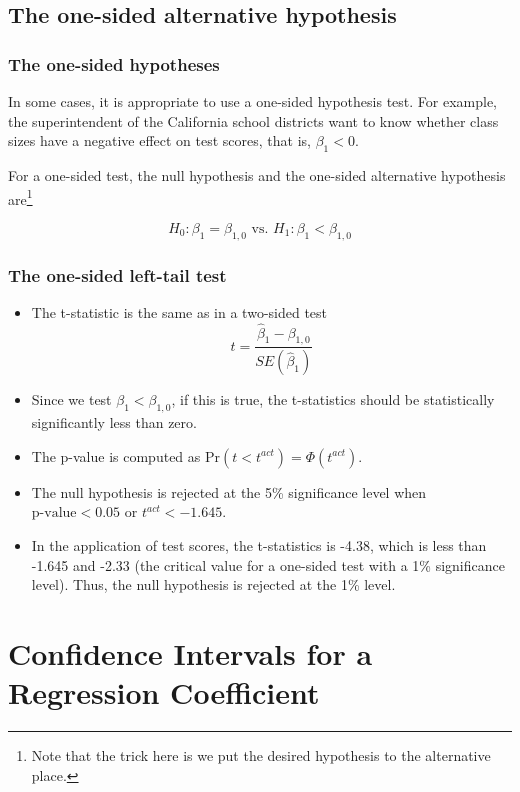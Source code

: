 \documentclass[a4paper,11pt]{article}
\newcommand{\pr}{\mathrm{Pr}}
\begin{document}
\subsection{The one-sided alternative hypothesis}
\label{sec:org183e3d3}
\subsubsection*{The one-sided hypotheses}
\label{sec:orgdaf9a76}
In some cases, it is appropriate to use a one-sided hypothesis
test. For example, the superintendent of the California school
districts want to know whether class sizes have a negative effect on
test scores, that is, \(\beta_1 < 0\). 

For a one-sided test, the null hypothesis and the one-sided
alternative hypothesis are\footnote{Note that the trick here is we put the
desired hypothesis to the alternative place.}  

\[ H_0: \beta_1 = \beta_{1,0} \text{ vs. } H_1: \beta_1 < \beta_{1,0} \]

\subsubsection*{The one-sided left-tail test}
\label{sec:orgf1118f0}
\begin{itemize}
\item The t-statistic is the same as in a two-sided test
\[ t = \frac{\hat{\beta}_1 - \beta_{1,0}}{SE(\hat{\beta}_1)} \]
\item Since we test \(\beta_1 < \beta_{1,0}\), if this is true, the
t-statistics should be statistically significantly less than zero.
\item The p-value is computed as \(\pr(t < t^{act}) = \varPhi(t^{act})\).
\item The null hypothesis is rejected at the 5\% significance level when
\(\text{p-value} < 0.05\) or \(t^{act} < -1.645\).
\item In the application of test scores, the t-statistics is -4.38, which
is less than -1.645 and -2.33 (the critical value for a one-sided
test with a 1\% significance level). Thus, the null hypothesis is
rejected at the 1\% level.
\end{itemize}

\section{Confidence Intervals for a Regression Coefficient}
\label{sec:org535b841}
\end{document}
